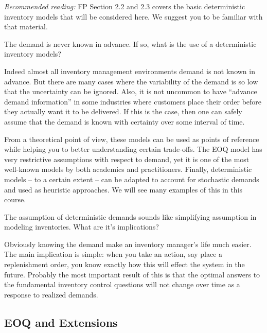 \textit{Recommended reading:} FP Section 2.2 and 2.3 covers the basic deterministic inventory models that will be considered here. We suggest you to be familiar with that material. 


\begin{question}
The demand is never known in advance. If so, what is the use of a deterministic inventory models?
\end{question}

\begin{solution}
Indeed almost all inventory management environments demand is not known in advance. But there are many cases where the variability of the demand is so low that the uncertainty can be ignored. Also, it is not uncommon to have ``advance demand information'' in some industries where customers place their order before they actually want it to be delivered. If this is the case, then one can safely assume that the demand is known with certainty over some interval of time. 

From a theoretical point of view, these models can be used as points of reference while helping you to better understanding certain trade-offs. The EOQ model has very restrictive assumptions with respect to demand, yet it is one of the most well-known models by both academics and practitioners. Finally, deterministic models -- to a certain extent -- can be adapted to account for stochastic demands and used as heuristic approaches. We will see many examples of this in this course.  
\end{solution}

\begin{question}
The assumption of deterministic demands sounds like simplifying assumption in modeling inventories. What are it's implications?
\end{question}

\begin{solution}
Obviously knowing the demand make an inventory manager's life much easier. The main implication is simple: when you take an action, say place a replenishment order, you know exactly how this will effect the system in the future. Probably the most important result of this is that the optimal answers to the fundamental inventory control questions will not change over time as a response to realized demands. 
\end{solution}

\subsection{EOQ and Extensions}

